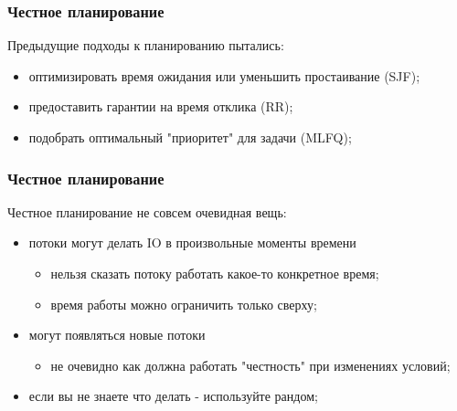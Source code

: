 \begin{frame}
\frametitle{Честное планирование}

Предыдущие подходы к планированию пытались:
\begin{itemize}
  \item оптимизировать время ожидания или уменьшить простаивание (SJF);
  \item предоставить гарантии на время отклика (RR);
  \item подобрать оптимальный "приоритет" для задачи (MLFQ);
\end{itemize}

\end{frame}

\begin{frame}
\frametitle{Честное планирование}

Честное планирование не совсем очевидная вещь:
\begin{itemize}
  \item потоки могут делать IO в произвольные моменты времени
        \begin{itemize}
          \item нельзя сказать потоку работать какое-то конкретное время;
          \item время работы можно ограничить только сверху;
        \end{itemize}
  \item могут появляться новые потоки
        \begin{itemize}
          \item не очевидно как должна работать "честность" при изменениях
                условий;
        \end{itemize}
  \item<2-> если вы не знаете что делать - используйте рандом;
\end{itemize}
\end{frame}

